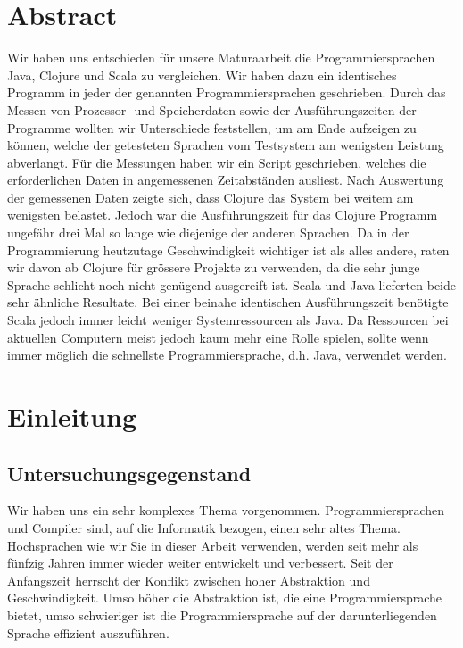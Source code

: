 \documentclass{fancydocument}
\begin{document}
\section{Abstract}
Wir haben uns entschieden für unsere Maturaarbeit die Programmiersprachen Java, Clojure und Scala zu vergleichen. Wir haben dazu ein identisches Programm in jeder der genannten Programmiersprachen geschrieben. Durch das Messen von Prozessor- und Speicherdaten sowie der Ausführungszeiten der Programme wollten wir Unterschiede feststellen, um am Ende aufzeigen zu können, welche der getesteten Sprachen vom Testsystem am wenigsten Leistung abverlangt. Für die Messungen haben wir ein Script geschrieben, welches die erforderlichen Daten in angemessenen Zeitabständen ausliest. Nach Auswertung der gemessenen Daten zeigte sich, dass Clojure das System bei weitem am wenigsten belastet. Jedoch war die Ausführungszeit für das Clojure Programm ungefähr drei Mal so lange wie diejenige der anderen Sprachen. Da in der Programmierung heutzutage Geschwindigkeit wichtiger ist als alles andere, raten wir davon ab Clojure für grössere Projekte zu verwenden, da die sehr junge Sprache schlicht noch nicht genügend ausgereift ist. Scala und Java lieferten beide sehr ähnliche Resultate. Bei einer beinahe identischen Ausführungszeit benötigte Scala jedoch immer leicht weniger Systemressourcen als Java. Da Ressourcen bei aktuellen Computern meist jedoch kaum mehr eine Rolle spielen, sollte wenn immer möglich die schnellste Programmiersprache, d.h. Java, verwendet werden.
\section{Einleitung}

\subsection{Untersuchungsgegenstand}

Wir haben uns ein sehr komplexes Thema vorgenommen. Programmiersprachen und Compiler sind, auf die Informatik bezogen, einen sehr altes Thema. \\
Hochsprachen wie wir Sie in dieser Arbeit verwenden, werden seit mehr
als fünfzig Jahren immer wieder weiter entwickelt und verbessert. Seit
der Anfangszeit herrscht der Konflikt zwischen hoher Abstraktion und
Geschwindigkeit. Umso höher die Abstraktion ist, die eine
Programmiersprache bietet, umso schwieriger ist die Programmiersprache
auf der darunterliegenden Sprache effizient auszuführen.
\end{document}
